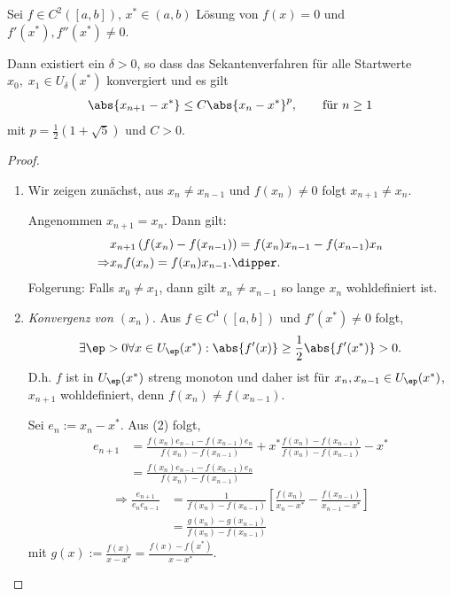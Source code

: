 \begin{prop}
\label{prop:5.1}
Sei $f\in C^2([a,b])$, $x^*\in (a,b)$ Lösung von $f(x) = 0$ und $f'(x^*),f''(x^*)\neq 0$.

Dann existiert ein $\delta > 0$, so dass das Sekantenverfahren für alle
Startwerte $x_0,\;x_1\in U_\delta(x^*)$ konvergiert und es gilt
\begin{align*}
\abs{x_{n+1}-x^*}\le C\abs{x_n-x^*}^p,\qquad \text{für } n\ge 1
\end{align*}
mit $p=\frac{1}{2}\left(1+\sqrt{5}\right)$ und $C>0$.\fishhere
\end{prop}
\begin{proof}
\begin{enumerate}[label=\arabic{*})]
  \item 
Wir zeigen zunächst, aus $x_n\neq x_{n-1}$ und $f(x_n)\neq 0$ folgt $x_{n+1}\neq
x_n$.

Angenommen $x_{n+1}=x_n$. Dann gilt:
\begin{align*}
&x_{n+1}\left(f(x_n) - f(x_{n-1}) \right) = f(x_n)x_{n-1} - f(x_{n-1})x_n\\
\Rightarrow & x_n f(x_n) = f(x_n)x_{n-1}.\dipper.
\end{align*}
Folgerung: Falls $x_0\neq x_1$, dann gilt $x_n\neq x_{n-1}$ so lange $x_n$
wohldefiniert ist.

\item \textit{Konvergenz von $(x_n)$}.
Aus $f\in C^1([a,b])$ und $f'(x^*)\neq 0$ folgt,
\begin{align*}
\exists \ep > 0 \forall x\in U_\ep(x^*) : \abs{f'(x)} \ge
\frac{1}{2}\abs{f'(x^*)} > 0.
\end{align*}
D.h. $f$ ist in $U_\ep(x^*)$ streng monoton und daher ist für $x_n,x_{n-1}\in
U_\ep(x^*)$, $x_{n+1}$ wohldefiniert, denn $f(x_n)\neq f(x_{n-1})$.

Sei $e_n := x_n-x^*$. Aus (2) folgt,
\begin{align*}
e_{n+1} &= \frac{f(x_n)e_{n-1}-f(x_{n-1})e_n}{f(x_n)-f(x_{n-1})}
+ x^* \frac{f(x_n)-f(x_{n-1})}{f(x_n)-f(x_{n-1})}-x^*
\\ &=  \frac{f(x_n)e_{n-1}-f(x_{n-1})e_n}{f(x_n)-f(x_{n-1})}
\end{align*}
\begin{align*}
\Rightarrow \frac{e_{n+1}}{e_ne_{n-1}} &= \frac{1}{f(x_n)-f(x_{n-1})}\left[
\frac{f(x_n)}{x_n-x^*} -\frac{f(x_{n-1})}{x_{n-1}-x^*}\right]\\
&= \frac{g(x_n)-g(x_{n-1})}{f(x_n)-f(x_{n-1})}
\end{align*}
mit $g(x) := \frac{f(x)}{x-x^*} = \frac{f(x)-f(x^*)}{x-x^*}$.


\end{enumerate}
\end{proof}
